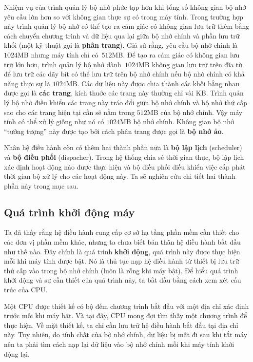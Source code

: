 Nhiệm vụ của trình quản lý bộ nhớ phức tạp hơn khi tổng số không gian bộ nhớ yêu cầu lớn
hơn so với không gian thực sự có trong máy tính. Trong trường hợp này trình quản lý bộ nhớ
có thể tạo ra cảm giác có không gian lưu trữ thêm bằng cách chuyển chương trình và dữ liệu
qua lại giữa bộ nhớ chính và phần lưu trữ khối (một kỹ thuật gọi là \textbf{phân
  trang}). Giả sử rằng, yêu cầu bộ nhớ chính là $1024$MB nhưng máy tính chỉ có~$512$MB. Để
tạo ra cảm giác có không gian lưu trữ lớn hơn, trình quản lý bộ nhớ dành~$1024$MB không
gian lưu trữ trên đĩa từ để lưu trữ các dãy bít có thể lưu trữ trên bộ nhớ chính nếu bộ
nhớ chính có khả năng thực sự là $1024$MB. Các dữ liệu này được chia thành các khối bằng
nhau được gọi là \textbf{các trang}, kích thuớc các trang này thường chỉ vài KB. Trình
quản lý bộ nhớ điều khiển các trang này tráo đổi giữa bộ nhớ chính và bộ nhớ thứ cấp sao
cho các trang hiện tại cần sẽ nằm trong $512$MB của bộ nhớ chính. Vậy máy tính có thể xử
lý giống như nó có $1024$MB bộ nhớ chính. Không gian bộ nhớ ``tưởng tượng'' này được tạo
bởi cách phân trang được gọi là \textbf{bộ nhớ ảo}.

Nhân hệ điều hành còn có thêm hai thành phần nữa là \textbf{bộ lập lịch} (scheduler) và
\textbf{bộ điều phối} (dispacher). Trong hệ thống chia sẻ thời gian thực, bộ lập lịch xác
định hoạt động nào được thực hiện và bộ điều phối điều khiển việc cấp phát thời gian bộ xử
lý cho các hoạt động này. Ta sẽ nghiên cứu chi tiết hai thành phần này trong mục sau.

\subsection*{Quá trình khởi động máy}
Ta đã thấy rằng hệ điều hành cung cấp cơ sở hạ tầng phần mềm cần thiết cho các đơn
vị phần mềm khác, nhưng ta chưa biết bản thân hệ điều hành bắt đầu như thế nào. Đây
chính là quá trình \textbf{khởi động}, quá trình này được thực hiện mỗi khi máy tính được
bật. Nó là thủ tục nạp hệ điều hành từ thiết bị lưu trữ thứ cấp vào trong bộ nhớ chính
(luôn là rỗng khi máy bật). Để hiểu quá trình khởi động và sự cần thiết của quá trình này,
ta bắt đầu bằng cách xem xét cấu trúc của CPU.

Một CPU được thiết kế có bộ đếm chương trình bắt đầu với một địa chỉ xác định trước mỗi
khi máy bật. Và tại đây, CPU mong đợi tìm thấy một chương trình để thực hiện. Về mặt thiết
kế, ta chỉ cần lưu trữ hệ điều hành bắt đầu tại địa chỉ này. Tuy nhiên, do tính chất của
bộ nhớ chính, dữ liệu bị mất đi sau khi tắt máy nên ta phải tìm cách nạp lại dữ liệu vào
bộ nhớ chính mỗi khi máy tính khởi động lại.

